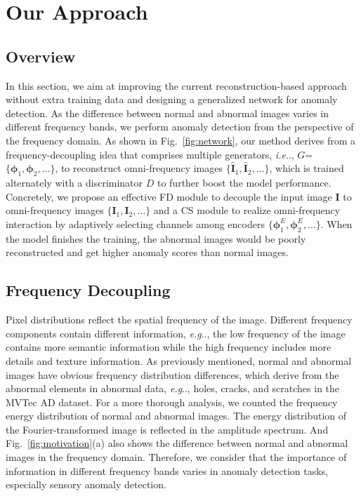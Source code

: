 \documentclass[lettersize,journal]{IEEEtran}
\makeatletter
\DeclareRobustCommand\onedot{\futurelet\@let@token\@onedot}
\def\@onedot{\ifx\@let@token.\else.\null\fi\xspace}
\def\eg{\emph{e.g}\onedot} \def\Eg{\emph{E.g}\onedot}
\def\ie{\emph{i.e}\onedot} \def\Ie{\emph{I.e}\onedot}
\makeatother
\begin{document}
\section{Our Approach}\label{sec:our_approach}
\subsection{Overview}
In this section, we aim at improving the current reconstruction-based approach without extra training data and designing a generalized network for anomaly detection. As the difference between normal and abnormal images varies in different frequency bands, we perform anomaly detection from the perspective of the frequency domain. As shown in Fig.~\ref{fig:network}, our method derives from a frequency-decoupling idea that comprises multiple generators, \ie, $G$=$\{\bm{\phi}_1, \bm{\phi}_2, \dots\}$, to reconstruct omni-frequency images $\{\hat{\bm{I}}_1, \hat{\bm{I}}_2, \dots\}$, which is trained alternately with a discriminator $D$ to further boost the model performance. Concretely, we propose an effective FD module to decouple the input image $\bm{I}$ to omni-frequency images $\{\bm{I}_1, \bm{I}_2, \dots\}$ and a CS module to realize omni-frequency interaction by adaptively selecting channels among encoders $\{\bm{\phi}_1^E, \bm{\phi}_2^E, \dots\}$. When the model finishes the training, the abnormal images would be poorly reconstructed and get higher anomaly scores than normal images. 
\subsection{Frequency Decoupling}
Pixel distributions reflect the spatial frequency of the image. Different frequency components contain different information, \eg, the low frequency of the image contains more semantic information while the high frequency includes more details and texture information. As previously mentioned, normal and abnormal images have obvious frequency distribution differences, which derive from the abnormal elements in abnormal data, \eg, holes, cracks, and scratches in the MVTec AD dataset. For a more thorough analysis, we counted the frequency energy distribution of normal and abnormal images. The energy distribution of the Fourier-transformed image is reflected in the amplitude spectrum. And Fig.~\ref{fig:motivation}(a) also shows the difference between normal and abnormal images in the frequency domain. Therefore, we consider that the importance of information in different frequency bands varies in anomaly detection tasks, especially sensory anomaly detection.
\end{document}
